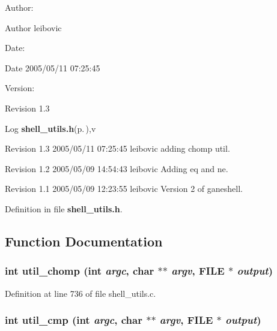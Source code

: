 \begin{Desc}
\item[Author:]\begin{Desc}
\item[Author]leibovic \end{Desc}
\end{Desc}
\begin{Desc}
\item[Date:]\begin{Desc}
\item[Date]2005/05/11 07:25:45 \end{Desc}
\end{Desc}
\begin{Desc}
\item[Version:]\begin{Desc}
\item[Revision]1.3 \end{Desc}
\end{Desc}
\begin{Desc}
\item[Log]{\bf shell\_\-utils.h}{\rm (p.\,\pageref{shell__utils_8h})},v \end{Desc}
Revision 1.3 2005/05/11 07:25:45 leibovic adding chomp util.

Revision 1.2 2005/05/09 14:54:43 leibovic Adding eq and ne.

Revision 1.1 2005/05/09 12:23:55 leibovic Version 2 of ganeshell.

Definition in file {\bf shell\_\-utils.h}.

\subsection{Function Documentation}
\subsubsection{\setlength{\rightskip}{0pt plus 5cm}int util\_\-chomp (int {\em argc}, char $\ast$$\ast$ {\em argv}, FILE $\ast$ {\em output})}\label{shell__utils_8h_a8}




Definition at line 736 of file shell\_\-utils.c.
\subsubsection{\setlength{\rightskip}{0pt plus 5cm}int util\_\-cmp (int {\em argc}, char $\ast$$\ast$ {\em argv}, FILE $\ast$ {\em output})}\label{shell__utils_8h_a5}


